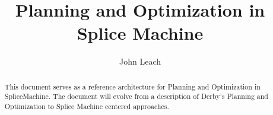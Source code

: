 \documentclass[10pt]{amsart}
\begin{document}
\title{Planning and Optimization in Splice Machine }
\author{John Leach}

\begin{abstract}
This document serves as a reference architecture for Planning and Optimization
in SpliceMachine.
The document will evolve from a description of Derby's Planning and Optimization
to Splice Machine centered approaches.
\end{abstract}

\maketitle


\end{document}
